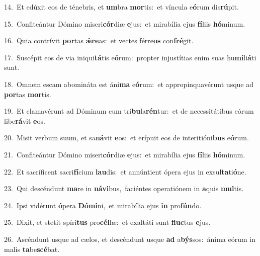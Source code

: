 {\numbfont\textcolor{\numbcolor}{14.}}~Et edúxit eos de ténebris, et \textbf{um}\-bra \textbf{mor}\-tis:~\star et víncula e\-\textbf{ó}\-rum dis\-\textbf{rú}\-pit.\par
{\numbfont\textcolor{\numbcolor}{15.}}~Confiteántur Dómino miseri\-\textbf{cór}\-diæ \textbf{e}\-jus:~\star et mirabília ejus \textbf{fí}\-liis \textbf{hó}\-minum.\par
{\numbfont\textcolor{\numbcolor}{16.}}~Quia contrívit \textbf{por}\-tas \textbf{ǽ}\-\textbf{re}as:~\star et vectes férre\textbf{os} con\-\textbf{fré}\-git.\par
{\numbfont\textcolor{\numbcolor}{17.}}~Suscépit eos de via iniqui\-\textbf{tá}\-tis e\-\textbf{ó}\-rum:~\star propter injustítias enim suas hu\-\textbf{mi}\-li\-\textbf{á}\-ti sunt.\par
{\numbfont\textcolor{\numbcolor}{18.}}~Omnem escam abomináta est áni\textbf{ma} e\-\textbf{ó}\-rum:~\star et appropinquavérunt usque ad \textbf{por}\-tas \textbf{mor}\-tis.\par
{\numbfont\textcolor{\numbcolor}{19.}}~Et clamavérunt ad Dóminum cum tri\-\textbf{bu}\-la\-\textbf{rén}\-tur:~\star et de necessitátibus eórum libe\-\textbf{rá}\-vit \textbf{e}\-os.\par
{\numbfont\textcolor{\numbcolor}{20.}}~Misit verbum suum, et sa\-\textbf{ná}\-vit \textbf{e}\-os:~\star et erípuit eos de interitióni\textbf{bus} e\-\textbf{ó}\-rum.\par
{\numbfont\textcolor{\numbcolor}{21.}}~Confiteántur Dómino miseri\-\textbf{cór}\-diæ \textbf{e}\-jus:~\star et mirabília ejus \textbf{fí}\-liis \textbf{hó}\-minum.\par
{\numbfont\textcolor{\numbcolor}{22.}}~Et sacríficent sacri\-\textbf{fí}\-cium \textbf{lau}\-dis:~\star et annúntient ópera ejus in exsul\-\textbf{ta}\-ti\-\textbf{ó}\-ne.\par
{\numbfont\textcolor{\numbcolor}{23.}}~Qui descéndunt \textbf{ma}\-re in \textbf{ná}\-\textbf{vi}bus,~\star faciéntes operatiónem in \textbf{a}\-quis \textbf{mul}\-tis.\par
{\numbfont\textcolor{\numbcolor}{24.}}~Ipsi vidérunt \textbf{ó}\-pera \textbf{Dó}\-\textbf{mi}ni,~\star et mirabília ejus \textbf{in} pro\-\textbf{fún}\-do.\par
{\numbfont\textcolor{\numbcolor}{25.}}~Dixit, et stetit spíri\textbf{tus} pro\-\textbf{cél}\-læ:~\star et exaltáti sunt \textbf{fluc}\-tus \textbf{e}\-jus.\par
{\numbfont\textcolor{\numbcolor}{26.}}~Ascéndunt usque ad cælos, et descéndunt usque \textbf{ad} a\-\textbf{býs}\-sos:~\star ánima eórum in malis \textbf{ta}\-be\-\textbf{scé}\-bat.\par
